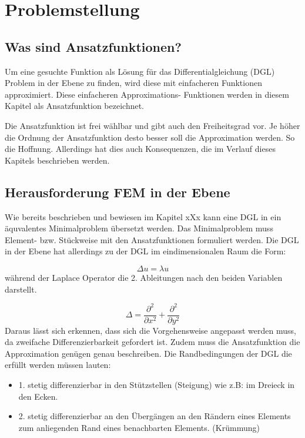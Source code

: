 %
%
%
\section{Problemstellung
\label{fem:section:problemstellung}}

\subsection{Was sind Ansatzfunktionen?}
Um eine gesuchte Funktion als Lösung für das Differentialgleichung (DGL) Problem in der Ebene zu finden, wird diese mit einfacheren Funktionen approximiert. Diese einfacheren Approximations- Funktionen werden in diesem Kapitel als Ansatzfunktion bezeichnet. 

Die Ansatzfunktion ist frei wählbar und gibt auch den Freiheitsgrad vor. Je höher die Ordnung der Ansatzfunktion desto besser soll die Approximation werden. So die Hoffnung. Allerdings hat dies auch Konsequenzen, die im Verlauf dieses Kapitels beschrieben werden. 


\subsection{Herausforderung FEM in der Ebene}
Wie bereits beschrieben und bewiesen im Kapitel xXx kann eine DGL in ein äquvalentes Minimalproblem übersetzt werden. Das Minimalproblem muss Element- bzw. Stückweise mit den Ansatzfunktionen formuliert werden. Die DGL in der Ebene hat allerdings zu der DGL im eindimensionalen Raum die Form:

\begin{equation}
	\Delta u = \lambda u
	\label{fem:DGL2D}
\end{equation} 
während der Laplace Operator die 2. Ableitungen nach den beiden Variablen darstellt.

\begin{equation}
	\Delta = \frac{\partial ^2}{\partial x^2} + \frac{\partial ^2}{\partial y^2}
\end{equation} 
Daraus lässt sich erkennen, dass sich die Vorgehensweise angepasst werden muss, da zweifache Differenzierbarkeit gefordert ist. Zudem muss die Ansatzfunktion die Approximation genügen genau beschreiben. Die Randbedingungen der DGL die erfüllt werden müssen lauten:
\begin{itemize}
	\item 1. stetig differenzierbar in den Stützstellen (Steigung) wie z.B: im Dreieck in den Ecken.
	\item 2. stetig differenzierbar an den Übergängen an den Rändern eines Elements zum anliegenden Rand eines benachbarten Elements. (Krümmung)
\end{itemize}


